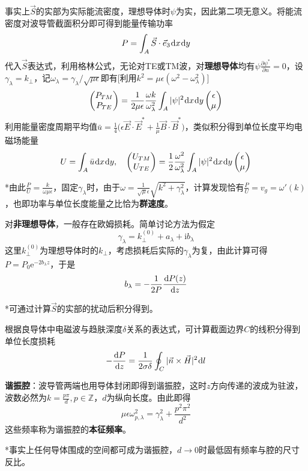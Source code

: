 \documentclass[a4paper,UTF8,fontset=windows]{ctexart}
\newcommand*{\dr}{\hspace{0.07em}\mathrm{d}}
\newcommand*{\er}{\mathrm{e}}
\newcommand*{\ir}{\mathrm{i}}
\newcommand*{\vb}{\vec{B}}
\newcommand*{\ve}{\vec{E}}
\newcommand*{\vh}{\vec{H}}
\newcommand*{\vs}{\vec{S}}
\newcommand*{\ves}{\vec{e}}
\newcommand*{\vns}{\vec{n}}
\newcommand*{\dt}[2][t]{\frac{\dr #2}{\dr #1}}
\newcommand*{\pt}[2][t]{\frac{\partial #2}{\partial #1}}
\begin{document}
事实上$\vs$的实部为实际能流密度，理想导体时$\psi$为实，因此第二项无意义。将能流密度对波导管截面积分即可得到能量传输功率
$$P=\int_A\vs\cdot\ves_3\dr x\dr y$$
代入$\vs$表达式，利用格林公式，无论对TE或TM波，对\textbf{理想导体}均有$\psi\pt[n]{\psi^*}=0$，设$\gamma_\lambda=k_\bot$，记$\omega_\lambda=\gamma_\lambda/\sqrt{\mu\epsilon}$即有[利用$k^2=\mu\epsilon(\omega^2-\omega_\lambda^2)$]
$$\begin{pmatrix}P_{TM}\\P_{TE}\end{pmatrix}=\frac{1}{2\mu\epsilon}\frac{\omega k}{\omega_\lambda^2}\int_A|\psi|^2\dr x\dr y\begin{pmatrix}\epsilon\\\mu\end{pmatrix}$$
利用能量密度周期平均值$\bar{u}=\frac{1}{4}\big(\epsilon\ve\cdot\ve^*+\frac{1}{\mu}\vb\cdot\vb^*\big)$，类似积分得到单位长度平均电磁场能量
$$U=\int_A\bar{u}\dr x\dr y,\quad\begin{pmatrix}U_{TM}\\U_{TE}\end{pmatrix}=\frac{1}{2}\frac{\omega^2}{\omega_\lambda^2}\int_A|\psi|^2\dr x\dr y\begin{pmatrix}\epsilon\\\mu\end{pmatrix}$$

*由此$\frac{P}{U}=\frac{k}{\omega\mu\epsilon}$，固定$\gamma_\lambda$时，由于$\omega=\frac{1}{\sqrt\mu\epsilon}\sqrt{k^2+\gamma_\lambda^2}$，计算发现恰有$\frac{P}{U}=v_g=\omega'(k)$，也即功率与单位长度能量之比恰为\textbf{群速度}。

对\textbf{非理想导体}，一般存在欧姆损耗。简单讨论方法为假定
$$\gamma_\lambda=k_\bot^{(0)}+a_\lambda+\ir b_\lambda$$
这里$k_\bot^{(0)}$为理想导体时的$k_\bot$，考虑损耗后实际的$\gamma_\lambda$为复，由此计算可得$P=P_0\er^{-2b_\lambda z}$，于是
$$b_\lambda=-\frac{1}{2P}\dt[z]{P(z)}$$

*可通过计算$\vs$的实部的扰动后积分得到。

根据良导体中电磁波与趋肤深度$\delta$关系的表达式，可计算截面边界$C$的线积分得到单位长度损耗
$$-\dt[z]{P}=\frac{1}{2\sigma\delta}\oint_C|\vns\times\vh|^2\dr l$$

\textbf{谐振腔}：波导管两端也用导体封闭即得到谐振腔，这时$z$方向传递的波成为驻波，波数必然为$k=\frac{p\pi}{d},p\in\mathbb{Z}$，$d$为纵向长度。由此即得
$$\mu\epsilon\omega_{p,\lambda}^2=\gamma_\lambda^2+\frac{p^2\pi^2}{d^2}$$
这些频率称为谐振腔的\textbf{本征频率}。

*事实上任何导体围成的空间都可成为谐振腔，$d\to 0$时最低固有频率与腔的尺寸反比。
\end{document}
